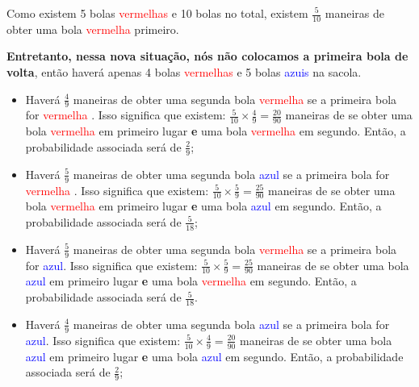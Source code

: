 \documentclass[
]{book}
\providecommand{\tightlist}{%
  \setlength{\itemsep}{0pt}\setlength{\parskip}{0pt}}
\begin{document}
\hfill\break

Como existem 5 bolas \textcolor{red}{vermelhas} e 10 bolas no total, existem \(\frac{5}{10}\) maneiras de obter uma bola
\textcolor{red}{vermelha} primeiro.

\hfill\break

\textbf{Entretanto, nessa nova situação, nós não colocamos a primeira bola de volta}, então haverá apenas 4 bolas \textcolor{red}{vermelhas} e 5 bolas \textcolor{blue}{azuis} na sacola.

\hfill\break

\begin{itemize}
\tightlist
\item
  Haverá \(\frac{4}{9}\) maneiras de obter uma segunda bola \textcolor{red}{vermelha} se a primeira bola for \textcolor{red}{vermelha} . Isso significa que existem: \(\frac{5}{10} \times \frac{4}{9}= \frac{20}{90}\) maneiras de se obter uma bola \textcolor{red}{vermelha} em primeiro lugar \textbf{e} uma bola \textcolor{red}{vermelha} em segundo. Então, a probabilidade associada será de \(\frac{2}{9}\);
\end{itemize}

\hfill\break

\begin{itemize}
\tightlist
\item
  Haverá \(\frac{5}{9}\) maneiras de obter uma segunda bola \textcolor{blue}{azul} se a primeira bola for \textcolor{red}{vermelha} . Isso significa que existem: \(\frac{5}{10} \times \frac{5}{9}= \frac{25}{90}\) maneiras de se obter uma bola \textcolor{red}{vermelha} em primeiro lugar \textbf{e} uma bola \textcolor{blue}{azul} em segundo. Então, a probabilidade associada será de \(\frac{5}{18}\);
\end{itemize}

\hfill\break

\begin{itemize}
\tightlist
\item
  Haverá \(\frac{5}{9}\) maneiras de obter uma segunda bola \textcolor{red}{vermelha} se a primeira bola for \textcolor{blue}{azul}. Isso significa que existem: \(\frac{5}{10} \times \frac{5}{9}= \frac{25}{90}\) maneiras de se obter uma bola \textcolor{blue}{azul} em primeiro lugar \textbf{e} uma bola \textcolor{red}{vermelha} em segundo. Então, a probabilidade associada será de \(\frac{5}{18}\).
\end{itemize}

\hfill\break

\begin{itemize}
\tightlist
\item
  Haverá \(\frac{4}{9}\) maneiras de obter uma segunda bola \textcolor{blue}{azul} se a primeira bola for \textcolor{blue}{azul}. Isso significa que existem: \(\frac{5}{10} \times \frac{4}{9}= \frac{20}{90}\) maneiras de se obter uma bola \textcolor{blue}{azul} em primeiro lugar \textbf{e} uma bola \textcolor{blue}{azul} em segundo. Então, a probabilidade associada será de \(\frac{2}{9}\);
\end{itemize}
\end{document}
